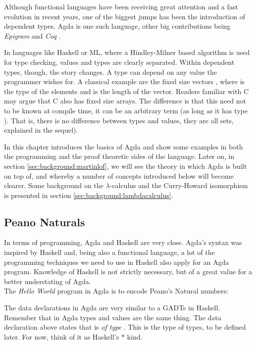 Although functional languages have been receiving great attention
and a fast evolution in recent years, one of the biggest jumps
has been the introduction of dependent types. Agda\cite{norell07} is one such language, other 
big contributions being \emph{Epigram} \cite{mcbride05} and \emph{Coq} \cite{bertot06}. 

In languages like Haskell or ML, where a Hindley-Milner based algorithm is used
for type checking, values and types are clearly separated. Within dependent
types, though, the story changes. A type can depend on any value the programmer
wishes for. A classical example are the fixed size vectors , where 
is the type of the elements and  is the length of the vector. Readers familiar
with C may argue that C also has fixed size arrays. The difference is that
this  need not to be known at compile time, it can be an arbitrary term (as long
as it has type ). That is, there is no difference between types and values,
they are all sets, explained in the sequel).

In this chapter introduces the basics of Agda and show some examples in both
the programming and the proof theoretic sides of the language. Later on, in 
section \ref{sec:background:martinlof}, we will see the theory in which Agda is built 
on top of, and whereby a number of concepts introduced below will become clearer. 
Some background on the $\lambda$-calculus and the Curry-Howard isomorphism is
presented in section \ref{sec:background:lambdacalculus}.

\subsection{Peano Naturals}

In terms of programming, Agda and Haskell are very close. Agda's syntax was
inspired by Haskell and, being also a functional language, a lot of
the programming techniques we need to use in Haskell also apply for an Agda program.
Knowledge of Haskell is not strictly necessary, but of a great value for a better
understating of Agda.\\

The \emph{Hello World} program in Agda is to encode Peano's Natural numbers:


The data declarations in Agda are very similar to a GADTs\cite{Xi2003} in Haskell. Remember that in Agda types and values are the same thing.
The data declaration above states that  is \emph{of type} 
. This  is the type of types, to be defined later. 
For now, think of it as Haskell's $*$ kind.


